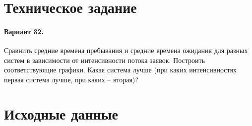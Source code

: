 





\tableofcontents
\listoffigures
\newpage

\section{Техническое задание}

\paragraph{Вариант 32.} 
Сравнить средние времена пребывания и средние времена ожидания для разных систем в зависимости от интенсивности потока заявок. Построить соответствующие графики. Какая система лучше (при каких интенсивностях первая система лучше, при каких – вторая)? 
	
\section{Исходные данные}


